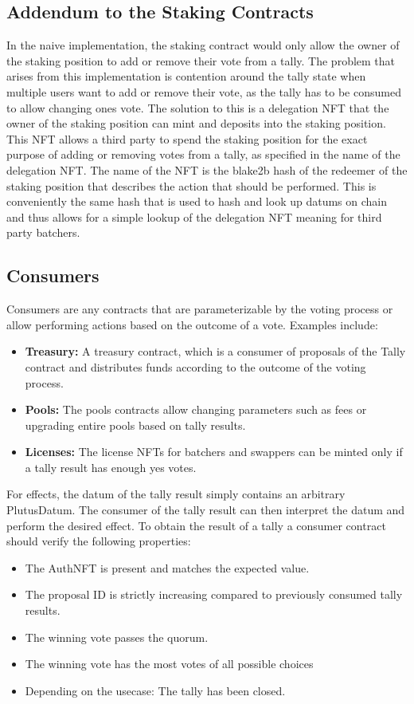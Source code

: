 \documentclass[11pt]{article}
\begin{document}
\subsection{Addendum to the Staking Contracts}

In the naive implementation, the staking contract would only allow the owner of the staking position to add or remove their vote from a tally.
The problem that arises from this implementation is contention around the tally state when multiple users want to add or remove their vote,
as the tally has to be consumed to allow changing ones vote.
The solution to this is a delegation NFT that the owner of the staking position can mint and deposits into the staking position.
This NFT allows a third party to spend the staking position for the exact purpose of adding or removing votes from a tally, as specified in the name
of the delegation NFT.
The name of the NFT is the blake2b hash of the redeemer of the staking position that describes the action that should be performed.
This is conveniently the same hash that is used to hash and look up datums on chain and thus allows for a simple lookup of the delegation NFT meaning for third party batchers.

\subsection{Consumers}

Consumers are any contracts that are parameterizable by the voting process or allow performing actions
based on the outcome of a vote. Examples include:

\begin{itemize}
    \item \textbf{Treasury:} A treasury contract, which is a consumer of proposals of the Tally contract and distributes funds according to the outcome of the voting process.
    \item \textbf{Pools:} The pools contracts allow changing parameters such as fees or upgrading entire pools based on tally results.
    \item \textbf{Licenses:} The license NFTs for batchers and swappers can be minted only if a tally result has enough yes votes.
\end{itemize}

For effects, the datum of the tally result simply contains an arbitrary PlutusDatum.
The consumer of the tally result can then interpret the datum and perform the desired effect.
To obtain the result of a tally a consumer contract should verify the following properties:
\begin{itemize}
    \item The AuthNFT is present and matches the expected value.
    \item The proposal ID is strictly increasing compared to previously consumed tally results.
    \item The winning vote passes the quorum.
    \item The winning vote has the most votes of all possible choices
    \item Depending on the usecase: The tally has been closed.
\end{itemize}
\end{document}
